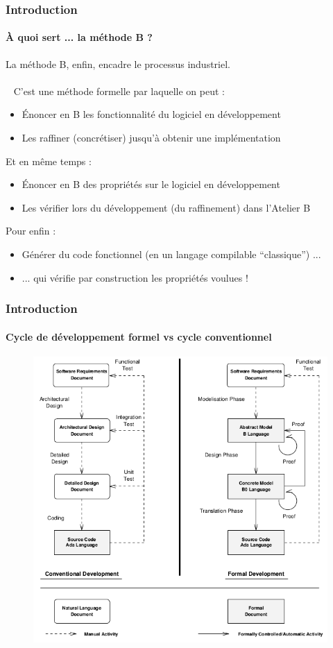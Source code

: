 \documentclass[11pt,a4paper,xcolor=table]{beamer} %
\begin{document}
\begin{frame}
\frametitle{Introduction}
\framesubtitle{À quoi sert ... la méthode B ?}
La méthode B, enfin, encadre le processus industriel.\\~\\~\pause
C'est une méthode formelle par laquelle on peut :\pause
\begin{itemize}
\item Énoncer en B les fonctionnalité du logiciel en développement
\pause
\item Les raffiner (concrétiser) jusqu'à obtenir une implémentation
\pause
\end{itemize}
Et en même temps :\pause
\begin{itemize}
\item Énoncer en B des propriétés sur le logiciel en développement
\pause
\item Les vérifier lors du développement (du raffinement) dans l'Atelier B
\pause
\end{itemize}
Pour enfin :
\begin{itemize}
\item Générer du code fonctionnel (en un langage compilable ``classique'') ...
\pause
\item ... qui vérifie par construction les propriétés voulues !
\end{itemize}
\end{frame}

\begin{frame}
\frametitle{Introduction}
\framesubtitle{Cycle de développement formel vs cycle conventionnel}
\begin{figure}[h]
\centering
\includegraphics[scale=0.33]{ressources/formal_dev.png}
\end{figure}
\end{frame}
\end{document}

